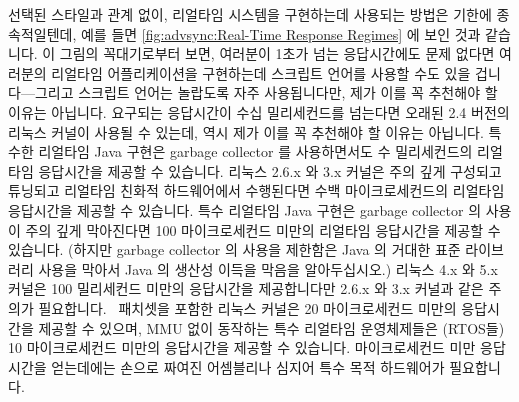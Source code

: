 선택된 스타일과 관계 없이, 리얼타임 시스템을 구현하는데 사용되는 방법은 기한에
종속적일텐데, 예를 들면
\cref{fig:advsync:Real-Time Response Regimes} 에 보인 것과 같습니다.
이 그림의 꼭대기로부터 보면, 여러분이 1초가 넘는 응답시간에도 문제 없다면
여러분의 리얼타임 어플리케이션을 구현하는데 스크립트 언어를 사용할 수도 있을
겁니다---그리고 스크립트 언어는 놀랍도록 자주 사용됩니다만, 제가 이를 꼭
추천해야 할 이유는 아닙니다.
요구되는 응답시간이 수십 밀리세컨드를 넘는다면 오래된 2.4 버전의 리눅스 커널이
사용될 수 있는데, 역시 제가 이를 꼭 추천해야 할 이유는 아닙니다.
특수한 리얼타임 Java 구현은 garbage collector 를 사용하면서도 수 밀리세컨드의
리얼타임 응답시간을 제공할 수 있습니다.
리눅스 2.6.x 와 3.x 커널은 주의 깊게 구성되고 튜닝되고 리얼타임 친화적
하드웨어에서 수행된다면 수백 마이크로세컨드의 리얼타임 응답시간을 제공할 수
있습니다.
특수 리얼타임 Java 구현은 garbage collector 의 사용이 주의 깊게 막아진다면 100
마이크로세컨드 미만의 리얼타임 응답시간을 제공할 수 있습니다.
(하지만 garbage collector 의 사용을 제한함은 Java 의 거대한 표준 라이브러리
사용을 막아서 Java 의 생산성 이득을 막음을 알아두십시오.)
리눅스 4.x 와 5.x 커널은 100 밀리세컨드 미만의 응답시간을 제공합니다만 2.6.x 와
3.x 커널과 같은 주의가 필요합니다.
\rt\ 패치셋을 포함한 리눅스 커널은 20 마이크로세컨드 미만의 응답시간을 제공할
수 있으며, MMU 없이 동작하는 특수 리얼타임 운영체제들은 (RTOS들) 10
마이크로세컨드 미만의 응답시간을 제공할 수 있습니다.
마이크로세컨드 미만 응답시간을 얻는데에는 손으로 짜여진 어셈블리나 심지어 특수
목적 하드웨어가 필요합니다.

\iffalse

